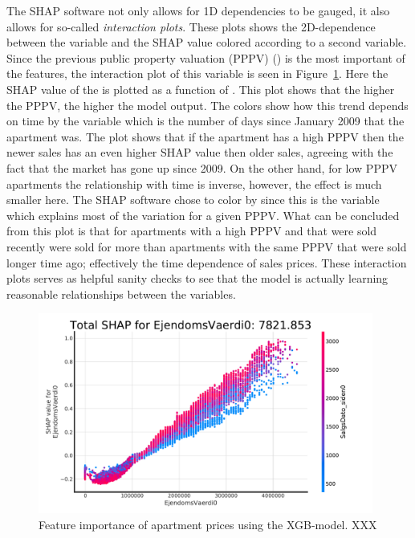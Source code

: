 The SHAP software \citep{lundbergConsistentIndividualizedFeature2018} not only allows for 1D dependencies to be gauged, it also allows for so-called \emph{interaction plots}. These plots shows the 2D-dependence between the variable and the SHAP value colored according to a second variable. Since the previous public property valuation (PPPV) () is the most important of the features, the interaction plot of this variable is seen in Figure~\ref{fig:h:shap_overview_interaction}. Here the SHAP value of the  is plotted as a function of . This plot shows that the higher the PPPV, the higher the model output. The colors show how this trend depends on time by the variable  which is the number of days since January  2009 that the apartment was. The plot shows that if the apartment has a high PPPV then the newer sales has an even higher SHAP value then older sales, agreeing with the fact that the market has gone up since 2009. On the other hand, for low PPPV apartments the relationship with time is inverse, however, the effect is much smaller here. The SHAP software chose to color by  since this is the variable which explains most of the variation for a given PPPV. What can be concluded from this plot is that for apartments with a high PPPV and that were sold recently were sold for more than apartments with the same PPPV that were sold longer time ago; effectively the time dependence of sales prices. These interaction plots serves as helpful sanity checks to see that the model is actually learning reasonable relationships between the variables. 

\begin{figure}[ht!]
  \centerfloat
  \includegraphics[draft=false, width=0.98\textwidth, trim=10 10 100 40, clip]{figures/housing/Ejerlejlighed_v19_cut_all_Ncols_all_xgb_tight_SHAP_vals_interaction_Vaerdi0.pdf}
  \caption[Feature importance of apartments prices using XGB XXX]
          {Feature importance of apartment prices using the XGB-model. XXX
          } 
  \label{fig:h:shap_overview_interaction}
\end{figure}

